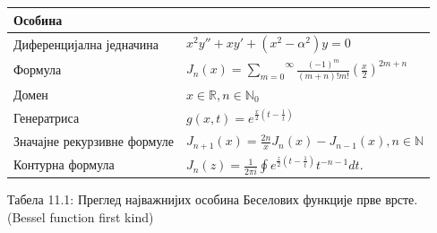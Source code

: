 {\def\LTcaptype{none} %
\begin{longtable}[]{@{}
  >{\raggedright\arraybackslash}p{}
  >{\centering\arraybackslash}p{}@{}}
\toprule\noalign{}
\begin{minipage}[b]{\linewidth}\raggedright
Особина
\end{minipage} & \begin{minipage}[b]{\linewidth}\centering
\end{minipage} \\
\midrule\noalign{}
\endhead
\bottomrule\noalign{}
\endlastfoot
Диференцијална једначина &
\(x^{2}y'' + xy' + \left( x^{2} - \alpha^{2} \right)y = 0\) \\
Формула &
\(J_{n}(x) = \overset{\infty}{\sum_{m = 0}}\frac{{( - 1)}^{m}}{(m + n)!m!}\left( \frac{x}{2} \right)^{2m + n}\) \\
Домен & \(x\mathbb{\in R,}n \in \mathbb{N}_{0}\) \\
Генератриса & \(g(x,t) = e^{\frac{x}{2}(t - \frac{1}{t})}\) \\
Значајне рекурзивне формуле &
\(J_{n + 1}\overset{}{(x)} = \frac{2n}{x}J_{n}\overset{}{(x)} - J_{n - 1}\overset{}{(x)},n\mathbb{\in N}\) \\
Контурна формула &
\(J_{n}\overset{}{(z)} = \frac{1}{2\pi i}\oint e^{\frac{z}{2}\left( t - \frac{1}{t} \right)}t^{- n - 1}dt.\) \\
\end{longtable}
}

Табела 11.1: Преглед најважнијих особина Беселових функције прве врсте.
(Bessel function first kind)

